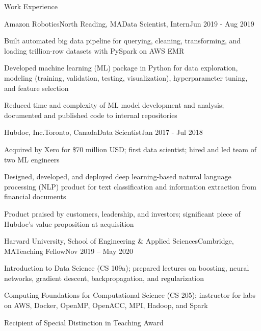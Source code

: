\documentclass{resume} %
\begin{document}
\begin{rSection}{Work Experience}

\begin{rSubsection}{Amazon Robotics}{North Reading, MA}{Data Scientist, Intern}{Jun 2019 - Aug 2019}

	\item Built automated big data pipeline for querying, cleaning, transforming, and loading trillion-row datasets with PySpark on AWS EMR
	\item Developed machine learning (ML) package in Python for data exploration, modeling (training, validation, testing, visualization), hyperparameter tuning, and feature selection
	\item Reduced time and complexity of ML model development and analysis; documented and published code to internal repositories
    
\end{rSubsection}


\begin{rSubsection}{Hubdoc, Inc.}{Toronto, Canada}{Data Scientist}{Jan 2017 - Jul 2018}

	\item Acquired by Xero for \$70 million USD; first data scientist; hired and led team of two ML engineers
	\item Designed, developed, and deployed deep learning-based natural language processing (NLP) product for text classification and information extraction from financial documents
	\item Product praised by customers, leadership, and investors; significant piece of Hubdoc's value proposition at acquisition
    
\end{rSubsection}


\begin{rSubsection}{Harvard University, School of Engineering \& Applied Sciences}{Cambridge, MA}{Teaching Fellow}{Nov 2019 -- May 2020}

\item Introduction to Data Science (CS 109a); prepared lectures on boosting, neural networks, gradient descent, backpropagation, and regularization
\item Computing Foundations for Computational Science (CS 205); instructor for labs on AWS, Docker, OpenMP, OpenACC, MPI, Hadoop, and Spark
\item Recipient of Special Distinction in Teaching Award
    
\end{rSubsection}

\end{rSection}
\end{document}
